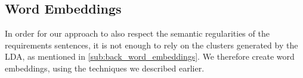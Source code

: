 \subsection{Word Embeddings}
In order for our approach to also respect the semantic regularities of the requirements sentences, it is not enough to rely on the clusters generated by the LDA, as mentioned in \autoref{sub:back_word_embeddings}. We therefore create word embeddings, using the techniques we described earlier.


